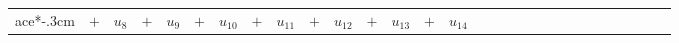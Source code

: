 {\begin{tabular}{rllllllllllllllllllllllllllll}
ace*{-.3cm} & \hspace*{-.3cm} $+$ \hspace*{-.3cm} & \hspace*{-.3cm} $u_8$ \hspace*{-.3cm} & \hspace*{-.3cm} $+$ \hspace*{-.3cm} & \hspace*{-.3cm} $u_9$\hspace*{-.3cm} &  \hspace*{-.3cm}$+$ \hspace*{-.3cm} &  \hspace*{-.3cm}$u_{10}$ \hspace*{-.3cm} & \hspace*{-.3cm} $+$ \hspace*{-.3cm} & \hspace*{-.3cm} $u_{11}$ \hspace*{-.3cm} &  \hspace*{-.3cm} $+$ \hspace*{-.3cm} & \hspace*{-.3cm} $u_{12}$ \hspace*{-.3cm} & \hspace*{-.3cm} $+$ \hspace*{-.3cm} & \hspace*{-.3cm} $u_{13}$ \hspace*{-.3cm} &  \hspace*{-.3cm} $+$ \hspace*{-.3cm} & \hspace*{-.3cm} $u_{14}$ \\

\end{tabular}}
